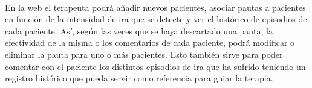\paragraph{}
En la web el terapeuta podrá añadir nuevos pacientes, asociar pautas a pacientes en función de la intensidad de ira que se detecte y ver el histórico de episodios de cada paciente. Así, según las veces que se haya descartado una pauta, la efectividad de la misma o los comentarios de cada paciente, podrá modificar o eliminar la pauta para uno o más pacientes. Esto también sirve para poder comentar con el paciente los distintos episodios de ira que ha sufrido teniendo un registro histórico que pueda servir como referencia para guiar la terapia.

